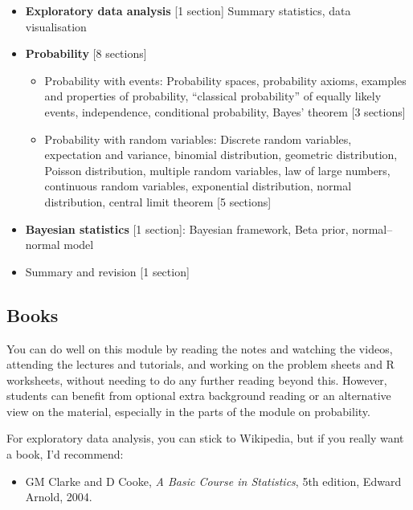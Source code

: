 \documentclass[
  a4paper,
]{book}
\providecommand{\tightlist}{%
  \setlength{\itemsep}{0pt}\setlength{\parskip}{0pt}}
\theoremstyle{definition}
\theoremstyle{definition}
\theoremstyle{definition}
\theoremstyle{definition}
\theoremstyle{remark}
\begin{document}
\begin{itemize}
\tightlist
\item
  \textbf{Exploratory data analysis} {[}1 section{]} Summary statistics, data visualisation
\item
  \textbf{Probability} {[}8 sections{]}

  \begin{itemize}
  \tightlist
  \item
    Probability with events: Probability spaces, probability axioms, examples and properties of probability, ``classical probability'' of equally likely events, independence, conditional probability, Bayes' theorem {[}3 sections{]}
  \item
    Probability with random variables: Discrete random variables, expectation and variance, binomial distribution, geometric distribution, Poisson distribution, multiple random variables, law of large numbers, continuous random variables, exponential distribution, normal distribution, central limit theorem {[}5 sections{]}
  \end{itemize}
\item
  \textbf{Bayesian statistics} {[}1 section{]}: Bayesian framework, Beta prior, normal--normal model
\item
  Summary and revision {[}1 section{]}
\end{itemize}

\hypertarget{books}{%
\subsection*{Books}\label{books}}

You can do well on this module by reading the notes and watching the videos, attending the lectures and tutorials, and working on the problem sheets and R worksheets, without needing to do any further reading beyond this. However, students can benefit from optional extra background reading or an alternative view on the material, especially in the parts of the module on probability.

For exploratory data analysis, you can stick to Wikipedia, but if you really want a book, I'd recommend:

\begin{itemize}
\tightlist
\item
  GM Clarke and D Cooke, \emph{A Basic Course in Statistics}, 5th edition, Edward Arnold, 2004.
\end{itemize}
\end{document}
